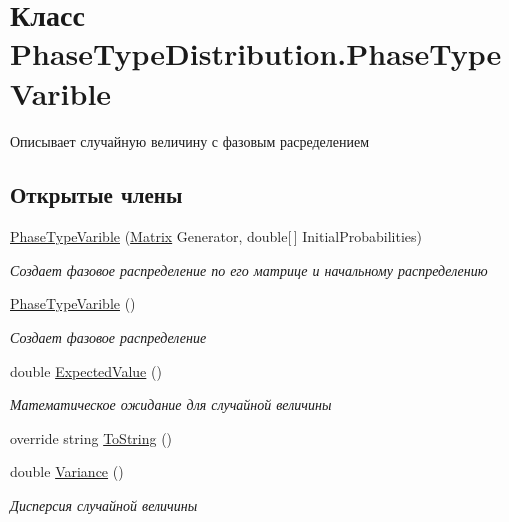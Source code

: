 \hypertarget{class_phase_type_distribution_1_1_phase_type_varible}{}\section{Класс Phase\+Type\+Distribution.\+Phase\+Type\+Varible}
\label{class_phase_type_distribution_1_1_phase_type_varible}


Описывает случайную величину с фазовым расределением  


\subsection*{Открытые члены}
\begin{DoxyCompactItemize}
\item 
\hyperlink{class_phase_type_distribution_1_1_phase_type_varible_a3748ae4cbdf3e0d6396e06d0407fd718}{Phase\+Type\+Varible} (\hyperlink{class_b_l_a_s_1_1_matrix}{Matrix} Generator, double\mbox{[}$\,$\mbox{]} Initial\+Probabilities)
\begin{DoxyCompactList}\small\item\em Создает фазовое распределение по его матрице и начальному распределению \end{DoxyCompactList}\item 
\hyperlink{class_phase_type_distribution_1_1_phase_type_varible_ab89c5d81e5cff2f95414f68cf622a773}{Phase\+Type\+Varible} ()
\begin{DoxyCompactList}\small\item\em Создает фазовое распределение \end{DoxyCompactList}\item 
double \hyperlink{class_phase_type_distribution_1_1_phase_type_varible_a29c6567b3097d81c011c426886cd2d6e}{Expected\+Value} ()
\begin{DoxyCompactList}\small\item\em Математическое ожидание для случайной величины \end{DoxyCompactList}\item 
override string \hyperlink{class_phase_type_distribution_1_1_phase_type_varible_a87c84666a7544595d687ec8913569147}{To\+String} ()
\item 
double \hyperlink{class_phase_type_distribution_1_1_phase_type_varible_a0a0eaea2b6b3aa60dc742204cac11447}{Variance} ()
\begin{DoxyCompactList}\small\item\em Дисперсия случайной величины \end{DoxyCompactList}\end{DoxyCompactItemize}
